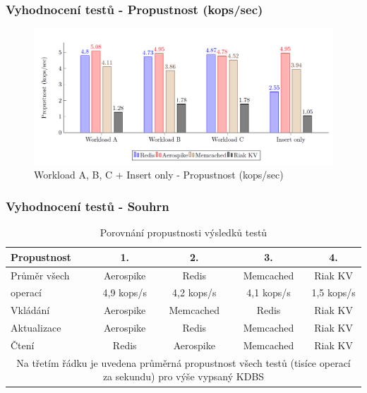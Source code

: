 \documentclass{beamer}
\begin{document}
	\begin{frame}
		\frametitle{Vyhodnocení testů - Propustnost (kops/sec)}
		\begin{figure}
			\centering
			\includegraphics[scale=0.43]{Figures/graf_prop.PNG}
			\caption{Workload A, B, C + Insert only - Propustnost (kops/sec)}
		\end{figure}
	\end{frame}
	
	\begin{frame}
		\frametitle{Vyhodnocení testů - Souhrn}
		\begin{table}
			\centering
			\begin{tabular}{ l | c c c c }
				\hline
				Propustnost & 1. & 2. & 3. & 4. \\
				\hline
				Průměr všech & Aerospike & Redis & Memcached & Riak KV \\
				operací & 4,9 kops/s & 4,2 kops/s & 4,1 kops/s & 1,5 kops/s\\
				Vkládání & Aerospike & Memcached & Redis & Riak KV \\
				Aktualizace & Aerospike & Redis & Memcached & Riak KV \\
				Čtení & Redis & Aerospike & Memcached & Riak KV \\
				\hline
				\multicolumn{5}{c}{\tiny Na třetím řádku je uvedena průměrná propustnost všech testů (tisíce operací za sekundu) pro výše vypsaný KDBS} \\
			\end{tabular}
			\caption{Porovnání propustnosti výsledků testů}
		\end{table}
	\end{frame}
	
\end{document}
